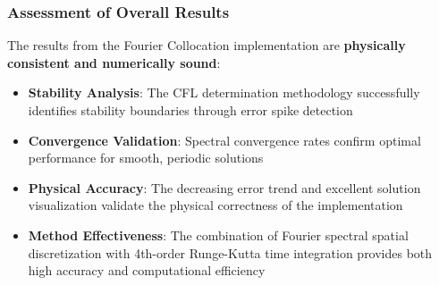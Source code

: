 \subsubsection{Assessment of Overall Results}
The results from the Fourier Collocation implementation are \textbf{physically consistent and numerically sound}:

\begin{itemize}
	\item \textbf{Stability Analysis}: The CFL determination methodology successfully identifies stability boundaries through error spike detection
	\item \textbf{Convergence Validation}: Spectral convergence rates confirm optimal performance for smooth, periodic solutions
	\item \textbf{Physical Accuracy}: The decreasing error trend and excellent solution visualization validate the physical correctness of the implementation
	\item \textbf{Method Effectiveness}: The combination of Fourier spectral spatial discretization with 4th-order Runge-Kutta time integration provides both high accuracy and computational efficiency
\end{itemize}
